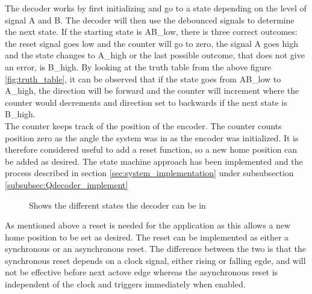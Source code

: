 \documentclass[../../../main]{subfiles}
\begin{document}
The decoder works by first initializing and go to a state depending on the level of signal A and B. The decoder will then use the debounced signals to determine the next state.
If the starting state is AB\_low, there is three correct outcomes: the reset signal goes low and the counter will go to zero, the signal A goes high and the state changes to A\_high or the last possible outcome, that does not give an error, is B\_high. By looking at the truth table from the above figure \ref{fig:truth_table}, it can be observed that if the state goes from AB\_low to A\_high, the direction will be forward and the counter will increment where the counter would decrements and direction set to backwards if the next state is B\_high.\\


The counter keeps track of the position of the encoder.  The counter counts position zero as the angle the system was in as the encoder was initialized. It is therefore considered useful to add a reset function, so a new home position can be added as desired. The state machine approach has been implemented and the process described in section \ref{sec:system_implementation} under subsubsection \ref{subsubsec:Qdecoder_implement}

\begin{figure}[H]
  \centering
  \def\svgwidth{\columnwidth}
  \fontsize{9}{9}\selectfont
  
  \caption{Shows the different states the decoder can be in}
  \label{fig:state_dia}
\end{figure}
As mentioned above a reset is needed for the application as this allows a new home position to be set as desired. The reset can be implemented as either a synchronous or an asynchronous reset. The difference between the two is that the synchronous reset depends on a clock signal, either rising or falling egde, and will not be effective before next actove edge whereas the asynchronous reset is independent of the clock and triggers immediately when enabled.
\end{document}
